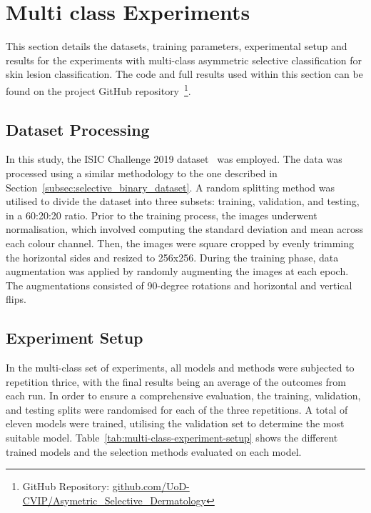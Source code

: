 \section{Multi class Experiments}
\label{sec:selective_multi_class_experiments}
This section details the datasets, training parameters, experimental setup and results for the experiments with multi-class asymmetric selective classification for skin lesion classification. The code and full results used within this section can be found on the project GitHub repository~\footnote{GitHub Repository: \url{github.com/UoD-CVIP/Asymetric_Selective_Dermatology}}.

\subsection{Dataset Processing}
In this study, the ISIC Challenge 2019 dataset~\citep{codella2018skin,combalia2019bcn20000,tschandl2018ham10000} was employed. The data was processed using a similar methodology to the one described in Section~\ref{subsec:selective_binary_dataset}. A random splitting method was utilised to divide the dataset into three subsets: training, validation, and testing, in a 60:20:20 ratio. Prior to the training process, the images underwent normalisation, which involved computing the standard deviation and mean across each colour channel. Then, the images were square cropped by evenly trimming the horizontal sides and resized to 256x256. During the training phase, data augmentation was applied by randomly augmenting the images at each epoch. The augmentations consisted of 90-degree rotations and horizontal and vertical flips.

\subsection{Experiment Setup}
In the multi-class set of experiments, all models and methods were subjected to repetition thrice, with the final results being an average of the outcomes from each run. In order to ensure a comprehensive evaluation, the training, validation, and testing splits were randomised for each of the three repetitions. A total of eleven models were trained, utilising the validation set to determine the most suitable model. Table~\ref{tab:multi-class-experiment-setup} shows the different trained models and the selection methods evaluated on each model.

